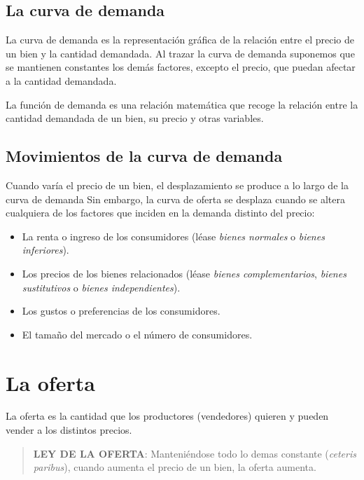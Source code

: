 \documentclass[
]{book}
\providecommand{\tightlist}{%
  \setlength{\itemsep}{0pt}\setlength{\parskip}{0pt}}
\begin{document}
\hypertarget{la-curva-de-demanda}{%
\subsection{La curva de demanda}\label{la-curva-de-demanda}}

La curva de demanda es la representación gráfica de la relación entre el precio de un bien y la cantidad demandada. Al trazar la curva de demanda suponemos que se mantienen constantes los demás factores, excepto el precio, que puedan afectar a la cantidad demandada.

La función de demanda es una relación matemática que recoge la relación entre la cantidad demandada de un bien, su precio y otras variables.

\hypertarget{movimientos-de-la-curva-de-demanda}{%
\subsection{Movimientos de la curva de demanda}\label{movimientos-de-la-curva-de-demanda}}

Cuando varía el precio de un bien, el desplazamiento se produce a lo largo de la curva de demanda Sin embargo, la curva de oferta se desplaza cuando se altera cualquiera de los factores que inciden en la demanda distinto del precio:

\begin{itemize}
\tightlist
\item
  La renta o ingreso de los consumidores (léase \emph{bienes normales} o \emph{bienes inferiores}).
\item
  Los precios de los bienes relacionados (léase \emph{bienes complementarios}, \emph{bienes sustitutivos} o \emph{bienes independientes}).
\item
  Los gustos o preferencias de los consumidores.
\item
  El tamaño del mercado o el número de consumidores.
\end{itemize}

\hypertarget{la-oferta}{%
\section{La oferta}\label{la-oferta}}

La oferta es la cantidad que los productores (vendedores) quieren y pueden vender a los distintos precios.

\begin{quote}
\textbf{LEY DE LA OFERTA}:
Manteniéndose todo lo demas constante (\emph{ceteris paribus}), cuando aumenta el precio de un bien, la oferta aumenta.
\end{quote}
\end{document}
